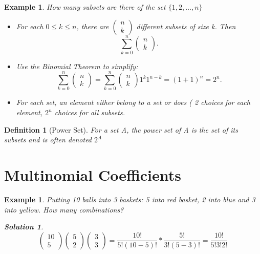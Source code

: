 \documentclass[a4paper]{article}
\newcounter{counter}
\numberwithin{counter}{subsection}
\theoremstyle{break}
\newtheorem{definition}{Definition}
\newtheorem{exmp}[counter]{Example}
\newtheorem*{solution}{Solution}
\begin{document}
			\begin{exmp}
				How many subsets are there of the set $\{1,2,\ldots,n\} $ \\
				\begin{itemize}
					\item For each $0 \le k \le n$, there are $\begin{pmatrix} n \\ k \end{pmatrix} $ different subsets of size k. Then \[
					\sum_{k=0}^{n} \begin{pmatrix} n \\ k \end{pmatrix} 
				.\] 
				\item Use the Binomial Theorem to simplify: \[
						\sum_{k=0}^{n} \begin{pmatrix} n \\ k \end{pmatrix} = \sum_{k=0}^{n} \begin{pmatrix} n\\k \end{pmatrix} 1^{k}1^{n-k}=(1+1)^{n}=2^{n}
					.\]  
				\item For each set, an element either belong to a set or does ( 2 choices for each element, $2^{n} $ choices for all subsets.
				\end{itemize}
			\end{exmp}
			
			\begin{definition}[Power Set]
				For a set A, the power set of A is the set of its subsets and is often denoted $2^{A}$
			\end{definition}

			\section{Multinomial Coefficients}%
			
			\begin{exmp}
				Putting 10 balls into 3 baskets: 5 into red basket, 2 into blue and 3 into yellow. How many combinations? 
				\begin{solution}
					$$\begin{pmatrix} 10 \\5	\end{pmatrix} \begin{pmatrix} 5 \\ 2\end{pmatrix} \begin{pmatrix} 3 \\ 3\end{pmatrix} = \frac{10!}{5!(10-5)!} * \frac{5!}{3!(5-3)!} = \frac{10!}{5!3!2!}$$
				\end{solution}
			\end{exmp}
\end{document}
